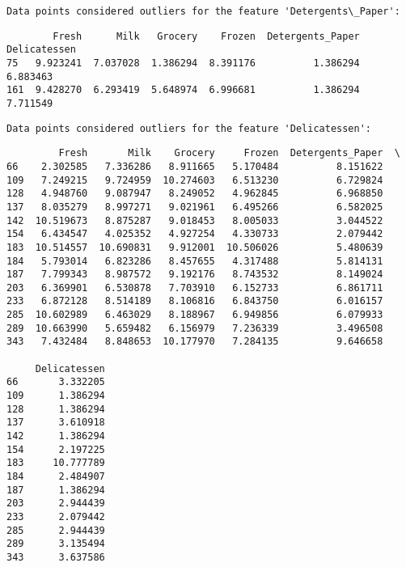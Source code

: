 \documentclass[11pt]{article}
\begin{document}
    
    \begin{Verbatim}[commandchars=\\\{\}]
Data points considered outliers for the feature 'Detergents\_Paper':

    \end{Verbatim}

    
    \begin{verbatim}
        Fresh      Milk   Grocery    Frozen  Detergents_Paper  Delicatessen
75   9.923241  7.037028  1.386294  8.391176          1.386294      6.883463
161  9.428270  6.293419  5.648974  6.996681          1.386294      7.711549
    \end{verbatim}

    
    \begin{Verbatim}[commandchars=\\\{\}]
Data points considered outliers for the feature 'Delicatessen':

    \end{Verbatim}

    
    \begin{verbatim}
         Fresh       Milk    Grocery     Frozen  Detergents_Paper  \
66    2.302585   7.336286   8.911665   5.170484          8.151622   
109   7.249215   9.724959  10.274603   6.513230          6.729824   
128   4.948760   9.087947   8.249052   4.962845          6.968850   
137   8.035279   8.997271   9.021961   6.495266          6.582025   
142  10.519673   8.875287   9.018453   8.005033          3.044522   
154   6.434547   4.025352   4.927254   4.330733          2.079442   
183  10.514557  10.690831   9.912001  10.506026          5.480639   
184   5.793014   6.823286   8.457655   4.317488          5.814131   
187   7.799343   8.987572   9.192176   8.743532          8.149024   
203   6.369901   6.530878   7.703910   6.152733          6.861711   
233   6.872128   8.514189   8.106816   6.843750          6.016157   
285  10.602989   6.463029   8.188967   6.949856          6.079933   
289  10.663990   5.659482   6.156979   7.236339          3.496508   
343   7.432484   8.848653  10.177970   7.284135          9.646658   

     Delicatessen  
66       3.332205  
109      1.386294  
128      1.386294  
137      3.610918  
142      1.386294  
154      2.197225  
183     10.777789  
184      2.484907  
187      1.386294  
203      2.944439  
233      2.079442  
285      2.944439  
289      3.135494  
343      3.637586  
    \end{verbatim}
\end{document}
